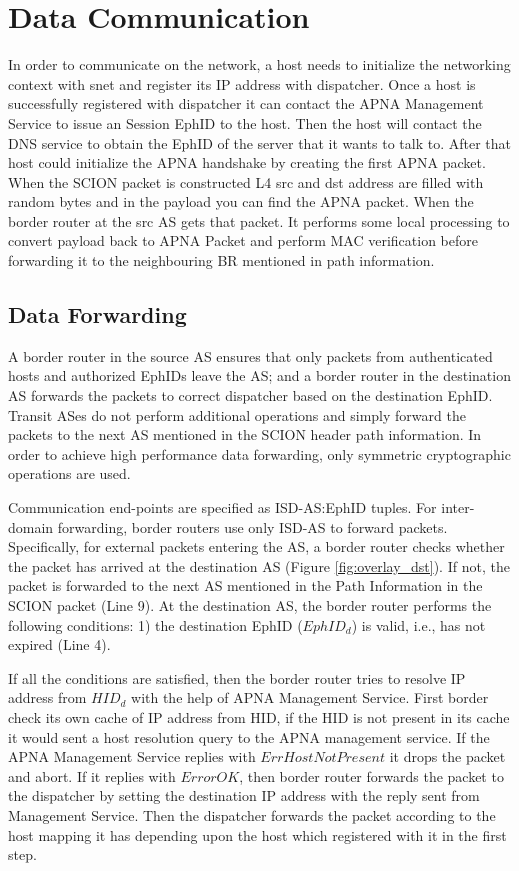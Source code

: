 \section{Data Communication} \label{overlay:comm}
In order to communicate on the network, a host needs to initialize the networking context with snet and register its IP address with dispatcher. Once a host is successfully registered with dispatcher it can contact the APNA Management Service to issue an Session EphID to the host. Then the host will contact the DNS service to obtain the EphID of the server that it wants to talk to. After that host could initialize the APNA handshake by creating the first APNA packet. When the SCION packet is constructed L4 src and dst address are filled with random bytes and in the payload you can find the APNA packet. When the border router at the src AS gets that packet. It performs some local processing to convert payload back to APNA Packet and perform MAC verification before forwarding it to the neighbouring BR mentioned in path information.

\subsection{Data Forwarding}
A border router in the source AS ensures that only packets from authenticated hosts and authorized EphIDs leave the AS; and a border router in the destination AS forwards the packets to correct dispatcher based on the destination EphID. Transit ASes do not perform additional operations and simply forward the packets to the next AS mentioned in the SCION header path information. In order to achieve high performance data forwarding, only symmetric cryptographic operations are used.

Communication end-points are specified as ISD-AS:EphID tuples. For inter-domain forwarding, border routers use only ISD-AS to forward packets. Specifically, for external packets entering the AS, a border router checks whether the packet has arrived at the destination AS (Figure \ref{fig:overlay_dst}). If not, the packet is forwarded to the next AS mentioned in the Path Information in the SCION packet (Line 9). At the destination AS, the border router performs the following conditions: 1) the destination EphID ($EphID_{d}$) is valid, i.e., has not expired (Line 4).

If all the conditions are satisfied, then the border router tries to resolve IP address from $HID_{d}$ with the help of APNA Management Service. First border check its own cache of IP address from HID, if the HID is not present in its cache it would sent a host resolution query to the APNA management service. If the APNA Management Service replies with $ErrHostNotPresent$ it drops the packet and abort. If it replies with $ErrorOK$, then border router forwards the packet to the dispatcher by setting the destination IP address with the reply sent from Management Service. Then the dispatcher forwards the packet according to the host mapping it has depending upon the host which registered with it in the first step.

